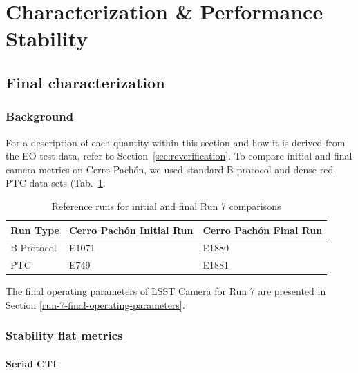 

\clearpage

\section{Characterization \& Performance Stability}\label{characterization-camera-stability}



\subsection{Final characterization}\label{sec:finalCharacterization}
\subsubsection{Background}\label{final_background}

For a description of each quantity within this section and how it is derived from the EO test data, refer to Section~\ref{sec:reverification}. To compare initial and final camera metrics on Cerro Pachón, we used standard B protocol and dense red PTC data sets (Tab.~\ref{tab:runTable}.

\begin{table}[ht]
\centering
\caption{Reference runs for initial and final Run 7 comparisons}
\label{tab:runTable}
\begin{tabular}{|l|l|l|}
\hline
\textbf{Run Type} & \textbf{Cerro Pachón Initial Run} & \textbf{Cerro Pachón Final Run} \\ \hline
B Protocol & E1071 & E1880 \\ \hline
PTC        & E749  & E1881 \\ \hline
\end{tabular}
\end{table}


The final operating parameters of LSST Camera for Run 7 are presented in Section \ref{run-7-final-operating-parameters}.

\subsubsection{Stability flat metrics}\label{sec:finalstability-flat-metrics}

\paragraph{Serial CTI}\label{sec:finalChar-serial-cti}

